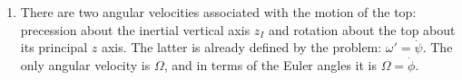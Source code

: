 \documentclass{article}
\theoremstyle{definition}
\newcommand{\p}{\partial}
\newcommand{\lag}{\mathcal{L}}
\newcommand{\f}[2]{\frac{#1}{#2}}
\newcommand{\lp}{\left(}
\newcommand{\rp}{\right)}
\begin{document}
\begin{enumerate}[label=(\alph*)]
%	
	\item There are two angular velocities associated with the motion of the top: precession about the inertial vertical axis $z_I$ and rotation about the top about its principal $z$ axis. The latter is already defined by the problem: $\boxed{\omega' = \dot\psi}$. The only angular velocity is $\Omega$, and in terms of the Euler angles it is $\boxed{\Omega = \dot\phi}$.\\
	

\end{enumerate}
\end{document}
